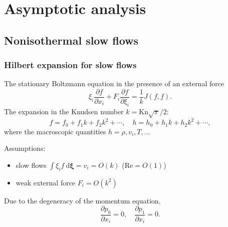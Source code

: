 \documentclass[mathserif]{beamer} %
\newcommand{\Kn}{\mathrm{Kn}}
\newcommand{\dd}{\:\mathrm{d}}
\newcommand{\pder}[2][]{\frac{\partial#1}{\partial#2}}
\newcommand{\dxi}{\boldsymbol{\dd\xi}}
\newcommand{\OO}[1]{O(#1)}
\begin{document}
\section{Asymptotic analysis}
\subsection{Nonisothermal slow flows}

\begin{frame}
    \frametitle{Hilbert expansion for slow flows}
    The stationary Boltzmann equation in the presence of an external force
    \begin{equation}\label{eq:Boltzmann}
        \xi_i\pder[f]{x_i} + F_i\pder[f]{\xi_i} = \frac1k J(f,f).
    \end{equation}
    The expansion in the Knudsen number \(k=\Kn\sqrt\pi/2\):
    \begin{equation}\label{eq:expansion}
        f = f_0 + f_1k + f_2k^2 + \cdots, \quad h = h_0 + h_1k + h_2k^2 + \cdots,
    \end{equation}
    where the macroscopic quantities \(h = \rho, v_i, T, \dots\)
    \vspace{5pt}\pause

    Assumptions:
    \begin{itemize}
        \item slow flows \(\int\xi_i f\dxi = v_i = \OO{k}\) (\(\mathrm{Re} = \OO{1}\))
        \item weak external force \(F_i = \OO{k^2}\)
    \end{itemize}
    Due to the degeneracy of the momentum equation,
    \begin{equation}
        \pder[p_0]{x_i} = 0, \quad \pder[p_1]{x_i} = 0.
    \end{equation}
\end{frame}
\end{document}
